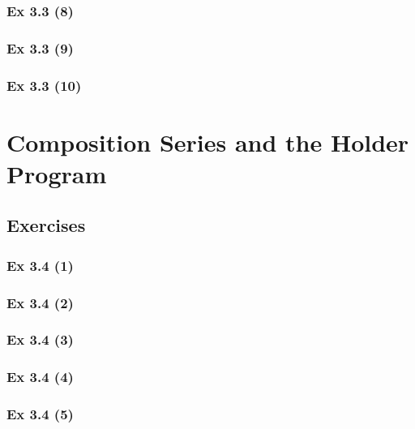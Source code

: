 \subsubsection{Ex 3.3 (8)}\label{sec:Ex_3.3.8}

\subsubsection{Ex 3.3 (9)}\label{sec:Ex_3.3.9}

\subsubsection{Ex 3.3 (10)}\label{sec:Ex_3.3.10}

\newpage		%

\section{Composition Series and the Holder Program}\label{sec:3.4}	
\subsection*{Exercises}\label{sec:3.4_Exercises}

\subsubsection{Ex 3.4 (1)}\label{sec:Ex_3.4.1}

\subsubsection{Ex 3.4 (2)}\label{sec:Ex_3.4.2}

\subsubsection{Ex 3.4 (3)}\label{sec:Ex_3.4.3}

\subsubsection{Ex 3.4 (4)}\label{sec:Ex_3.4.4}

\subsubsection{Ex 3.4 (5)}\label{sec:Ex_3.4.5}

